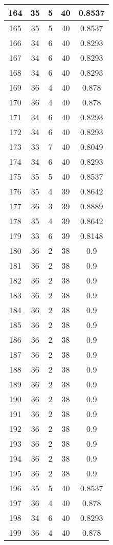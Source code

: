 \documentclass[letterpaper, 12pt]{article}
\begin{document}
\begin{longtable}{|c|c|c|c|c|}
\hline
164 & 35 & 5 & 40 & 0.8537 \\
\hline
165 & 35 & 5 & 40 & 0.8537 \\
\hline
166 & 34 & 6 & 40 & 0.8293 \\
\hline
167 & 34 & 6 & 40 & 0.8293 \\
\hline
168 & 34 & 6 & 40 & 0.8293 \\
\hline
169 & 36 & 4 & 40 & 0.878 \\
\hline
170 & 36 & 4 & 40 & 0.878 \\
\hline
171 & 34 & 6 & 40 & 0.8293 \\
\hline
172 & 34 & 6 & 40 & 0.8293 \\
\hline
173 & 33 & 7 & 40 & 0.8049 \\
\hline
174 & 34 & 6 & 40 & 0.8293 \\
\hline
175 & 35 & 5 & 40 & 0.8537 \\
\hline
176 & 35 & 4 & 39 & 0.8642 \\
\hline
177 & 36 & 3 & 39 & 0.8889 \\
\hline
178 & 35 & 4 & 39 & 0.8642 \\
\hline
179 & 33 & 6 & 39 & 0.8148 \\
\hline
180 & 36 & 2 & 38 & 0.9 \\
\hline
181 & 36 & 2 & 38 & 0.9 \\
\hline
182 & 36 & 2 & 38 & 0.9 \\
\hline
183 & 36 & 2 & 38 & 0.9 \\
\hline
184 & 36 & 2 & 38 & 0.9 \\
\hline
185 & 36 & 2 & 38 & 0.9 \\
\hline
186 & 36 & 2 & 38 & 0.9 \\
\hline
187 & 36 & 2 & 38 & 0.9 \\
\hline
188 & 36 & 2 & 38 & 0.9 \\
\hline
189 & 36 & 2 & 38 & 0.9 \\
\hline
190 & 36 & 2 & 38 & 0.9 \\
\hline
191 & 36 & 2 & 38 & 0.9 \\
\hline
192 & 36 & 2 & 38 & 0.9 \\
\hline
193 & 36 & 2 & 38 & 0.9 \\
\hline
194 & 36 & 2 & 38 & 0.9 \\
\hline
195 & 36 & 2 & 38 & 0.9 \\
\hline
196 & 35 & 5 & 40 & 0.8537 \\
\hline
197 & 36 & 4 & 40 & 0.878 \\
\hline
198 & 34 & 6 & 40 & 0.8293 \\
\hline
199 & 36 & 4 & 40 & 0.878 \\
\hline
\end{longtable}
\end{document}
